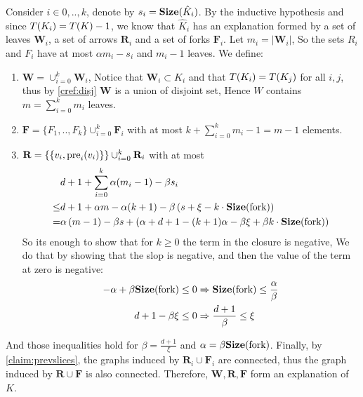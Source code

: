 \documentclass{beamer}
\begin{document}
\begin{frame}
\begin{enumerate}
        Consider $i \in 0,..,k$, denote by $s_{i} = \mathbf{Size}(\hat{K}_{i})$. By the inductive hypothesis and since $T(K_{i}) = T(K) - 1$, we know that $\hat{K}_{i}$ has an explanation formed by a set of leaves $\mathbf{W}_{i}$, a set of arrows $\mathbf{R}_{i}$ and a set of forks $\mathbf{F}_{i}$. Let $m_{i} =|\mathbf{W}_{i}|$, So the sets $R_{i}$ and $F_{i}$ have at most $\alpha m_{i} - s_{i}$ and $m_{i}-1$ leaves. We define:
        \begin{enumerate}
          \item $\mathbf{W} = \cup_{i=0}^{k} \mathbf{W}_{i}$, Notice that $\mathbf{W}_{i} \subset K_{i}$ and that $T(K_{i}) = T(K_{j})$ for all $i,j$, thus by \cref{cref:disj} $\mathbf{W}$ is a union of disjoint set, Hence $W$ contains  $m = \sum_{i=0}^{k}m_{i}$ leaves. 
          \item $\mathbf{F} = \{ F_{1},..,F_{k} \} \cup_{i = 0}^{k}\mathbf{F}_{i}$ with at most $ k + \sum_{i=0}^{k}{m_{i} -1 } = m- 1$ elements. 
          \item $\mathbf{R} = \{ \{v_{i}, \text{pre}_{i}(v_{i}) \} \} \cup_{i=0}^{k}{ \mathbf{R}_{i} }$ with at most 
            \begin{equation*}
              \begin{split}
                & d+1 + \sum^{k}_{i=0}{\alpha (m_{i}-1)  - \beta s_{i} } \\ 
                \le & d+1 + \alpha m - \alpha(k+1) - \beta\left(s + \xi - k \cdot \mathbf{Size}(\text{fork})  \right) \\
                = & \alpha \left(m - 1\right) - \beta s + \left(\alpha + d+1 - (k+1) \alpha - \beta \xi + \beta k \cdot \mathbf{Size}(\text{fork}) \right)
              \end{split}
            \end{equation*}
            So its enough to show that for $k\ge 0$ the term in the closure is negative, We do that by showing that the slop is negative, and then the value of the term at zero is negative: 
            \begin{equation*}
              \begin{split}
                  - \alpha  +  \beta \mathbf{Size}(\text{fork}) \le 0 & \Rightarrow   \mathbf{Size}(\text{fork}) \le \frac{\alpha}{\beta} \\ 
                 d + 1  -\beta \xi \le 0 & \Rightarrow \frac{d+1}{\beta} \le \xi
              \end{split}
            \end{equation*}
        \end{enumerate}
        And those inequalities hold for $\beta = \frac{d+1}{\xi}$ and $\alpha = \beta \mathbf{Size}(\text{fork})$. Finally, by \cref{claim:prevslices}, the graphs induced by $\mathbf{R}_{i} \cup \mathbf{F}_{i}$ are connected, thus the graph induced by $\mathbf{R}\cup \mathbf{F}$ is also connected. Therefore, $\mathbf{W}, \mathbf{R}, \mathbf{F}$ form an explanation of $K$. 
    \end{enumerate}

\end{frame}
\end{document}
